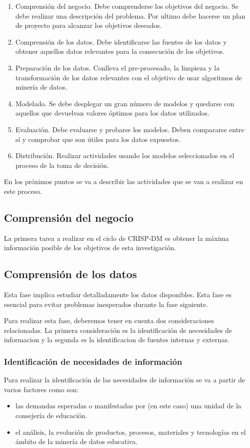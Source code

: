 \begin{enumerate}
	\item Comprensión del negocio. Debe comprenderse los objetivos del negocio. Se debe realizar una descripción del problema. Por ultimo debe hacerse un plan de proyecto para alcanzar los objetivos deseados.
	\item Comprensión de los datos. Debe identificarse las fuentes de los datos y obtener aquellos datos relevantes para la consecución de los objetivos.
	\item Preparación de los datos. Conlleva el pre-procesado, la limpieza y la transformación de los datos relevantes con el objetivo de usar algoritmos de minería de datos.
	\item Modelado. Se debe desplegar un gran número de modelos y quedarse con aquellos que devuelvan valores óptimos para los datos utilizados.
	\item Evaluación. Debe evaluarse y probarse los modelos. Deben compararse entre sí y comprobar que son útiles para los datos expuestos.
	\item Distribución. Realizar actividades usando los modelos seleccionados en el proceso de la toma de decisión.
\end{enumerate}

En los próximos puntos se va a describir las actividades que se van a realizar en este proceso.

\subsection{Comprensión del negocio}
La primera tarea a realizar en el ciclo de CRISP-DM es obtener la máxima información posible de los objetivos de esta investigación.


\subsection{Comprensión de los datos}
Esta fase implica estudiar detalladamente los datos disponibles. Esta fase es esencial para evitar problemas inesperados durante la fase siguiente.

Para realizar esta fase, deberemos tener en cuenta dos consideraciones relacionadas. La primera consideración es la identificación de necesidades de informacion y la segunda es la identificacion de fuentes internas y externas.

\subsubsection{Identificación de necesidades de información}
Para realizar la identificación de las necesidades de información se va a partir de varios factores como son:
\begin{itemize}
	\item las demandas esperadas o manifestadas por (en este caso) una unidad de la consejería de educación.
	\item el análisis, la evolución de productos, procesos, materiales y tecnologías en el ámbito de la minería de datos educativa.
\end{itemize}
